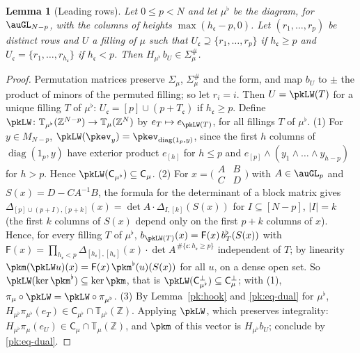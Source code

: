 \documentclass[10pt]{amsart}
\newtheorem{lemma}[theorem]{Lemma}
\theoremstyle{definition}
\theoremstyle{remark}
\newcommand{\C}{\mathbb C}
\newcommand{\Z}{\mathbb Z}
\begin{document}
\begin{lemma}[Leading rows]\label{pk:leading}
Let $0\le p<N$ and let $\mu^\flat$ be the diagram, for $\auGL_{N-p}$, with the columns of heights
$\max(h_{\mathfrak c}-p,0)$. Let $(r_1,\dots,r_p)$ be distinct rows and $U$ a filling of $\mu$ such
that $U_{\mathfrak c}\supseteq\{r_1,\dots,r_p\}$ if $h_{\mathfrak c}\ge p$ and $U_{\mathfrak c}=
\{r_1,\dots,r_{h_{\mathfrak c}}\}$ if $h_{\mathfrak c}<p$. Then $H_{\mu^\flat}\,b_U\in\Sigma_\mu^\#$.
\end{lemma}
\begin{proof}
Permutation matrices preserve $\Sigma_\mu$, $\Sigma_\mu^\#$ and the form, and map $b_U$ to $\pm$
the product of minors of the permuted filling; so let $r_i=i$. Then $U=\pkLW(T)$ for a unique
filling $T$ of $\mu^\flat$: $U_{\mathfrak c}=[p]\cup(p+T_{\mathfrak c})$ if $h_{\mathfrak c}\ge p$.
Define $\pkLW\colon\mathbb T_{\mu^\flat}(\Z^{N-p})\to\mathbb T_\mu(\Z^N)$ by $e_T\mapsto
e_{\pkLW(T)}$, for all fillings $T$ of $\mu^\flat$. (1) For $y\in M_{N-p}$,
$\pkLW(\pkev_y)=\pkev_{\operatorname{diag}(1_p,y)}$, since the first $h$ columns of
$\operatorname{diag}(1_p,y)$ have exterior product $e_{[h]}$ for $h\le p$ and $e_{[p]}\wedge(y_1
\wedge\dots\wedge y_{h-p})$ for $h>p$. Hence $\pkLW(\mathsf C_{\mu^\flat})\subseteq\mathsf C_\mu$.
(2) For $x=\bigl(\begin{smallmatrix}A&B\\C&D\end{smallmatrix}\bigr)$ with $A\in\auGL_p$ and
$S(x)=D-CA^{-1}B$, the formula for the determinant of a block matrix gives
$\Delta_{[p]\cup(p+I),[p+k]}(x)=\det A\cdot\Delta_{I,[k]}(S(x))$ for $I\subseteq[N-p]$, $|I|=k$ (the
first $k$ columns of $S(x)$ depend only on the first $p+k$ columns of $x$). Hence, for every
filling $T$ of $\mu^\flat$, $b_{\pkLW(T)}(x)=\mathsf F(x)\,b^\flat_T(S(x))$ with $\mathsf F(x)=
\prod_{h_{\mathfrak c}<p}\Delta_{[h_{\mathfrak c}],[h_{\mathfrak c}]}(x)\cdot\det A^{\,\#\{\mathfrak
c:h_{\mathfrak c}\ge p\}}$ independent of $T$; by linearity $\pkm(\pkLW u)(x)=\mathsf F(x)\,
\pkm^\flat(u)(S(x))$ for all $u$, on a dense open set. So $\pkLW(\ker\pkm^\flat)\subseteq\ker\pkm$,
that is $\pkLW(\mathsf C_{\mu^\flat}^\perp)\subseteq\mathsf C_\mu^\perp$; with (1),
$\pi_\mu\circ\pkLW=\pkLW\circ\pi_{\mu^\flat}$. (3) By Lemma~\ref{pk:hook} and \eqref{pk:eq-dual} for
$\mu^\flat$, $H_{\mu^\flat}\pi_{\mu^\flat}(e_T)\in\mathsf C_{\mu^\flat}\cap\mathbb T_{\mu^\flat}(\Z)$.
Applying $\pkLW$, which preserves integrality: $H_{\mu^\flat}\pi_\mu(e_U)\in\mathsf C_\mu\cap\mathbb
T_\mu(\Z)$, and $\pkm$ of this vector is $H_{\mu^\flat}b_U$; conclude by \eqref{pk:eq-dual}.
\end{proof}
\end{document}
